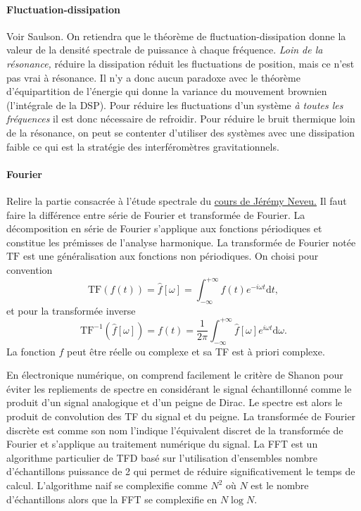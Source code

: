\documentclass[12pt,a4paper]{article}
\renewcommand{\d}{\mathrm{d}}
\newcommand{\tf}{\mathrm{TF}}
\begin{document}
\paragraph{Fluctuation-dissipation\\}
Voir Saulson.
On retiendra que le théorème de fluctuation-dissipation donne la valeur de la densité spectrale de puissance à chaque fréquence.
\emph{Loin de la résonance,} réduire la dissipation réduit les fluctuations de position, mais ce n'est pas vrai à résonance.
Il n'y a donc aucun paradoxe avec le théorème d'équipartition de l'énergie qui donne la variance du mouvement brownien (l'intégrale de la DSP).
Pour réduire les fluctuations d'un système \emph{à toutes les fréquences} il est donc nécessaire de refroidir.
Pour réduire le bruit thermique loin de la résonance, on peut se contenter d'utiliser des systèmes avec une dissipation faible ce qui est la stratégie des interféromètres gravitationnels.

\paragraph{Fourier\\}
Relire la partie consacrée à l'étude spectrale du \href{https://gitlab.in2p3.fr/Jeremy/Electronique/-/blob/master/Cours/electronique.pdf}{cours de Jérémy Neveu.}
Il faut faire la différence entre série de Fourier et transformée de Fourier.
La décomposition en série de Fourier s'applique aux fonctions périodiques et constitue les prémisses de l'analyse harmonique.
La transformée de Fourier notée $\tf$ est une généralisation aux fonctions non périodiques.
On choisi pour convention 
\begin{equation}
\tf (f(t)) = \hat{f}[\omega] = \int_{-\infty}^{+\infty} f(t) e^{-i\omega t} \d t,
\end{equation}
et pour la transformée inverse
\begin{equation}
\tf^{-1} (\hat{f}[\omega]) = f(t) = \frac{1}{2\pi}\int_{-\infty}^{+\infty} \hat{f}[\omega] e^{i\omega t} \d \omega.
\end{equation}
La fonction $f$ peut être réelle ou complexe et sa TF est à priori complexe.

En électronique numérique, on comprend facilement le critère de Shanon pour éviter les repliements de spectre en considérant le signal échantillonné comme le produit d'un signal analogique et d'un peigne de Dirac.
Le spectre est alors le produit de convolution des TF du signal et du peigne.
La transformée de Fourier discrète est comme son nom l'indique l'équivalent discret de la transformée de Fourier et s'applique au traitement numérique du signal.
La FFT est un algorithme particulier de TFD basé sur l'utilisation d'ensembles nombre d'échantillons puissance de 2 qui permet de réduire significativement le temps de calcul.
L'algorithme naif se complexifie comme $N^2$ où $N$ est le nombre d'échantillons alors que la FFT se complexifie en $N\log N$.
\end{document}

